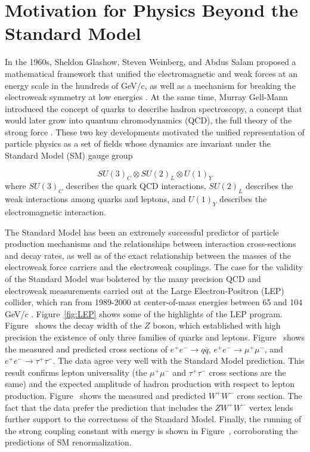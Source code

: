 \documentclass[dissertation.tex]{subfiles}
\begin{document}
\chapter{Motivation for Physics Beyond the Standard Model}
\label{chap:Motivation for Physics Beyond the Standard Model}

\thispagestyle{myheadings}
\markright{\hfill}

In the 1960s, Sheldon Glashow, Steven Weinberg, and Abdus Salam proposed a mathematical framework that unified the electromagnetic and weak forces at an energy scale in the hundreds of GeV/c, as well as a mechanism for breaking the electroweak symmetry at low energies \cite{Glashow1961579,PhysRevD.2.1285,PhysRev.127.965,PhysRevLett.19.1264,Salam1964168}.  At the same time, Murray Gell-Mann introduced the concept of quarks to describe hadron spectroscopy, a concept that would later grow into quantum chromodynamics (QCD), the full theory of the strong force \cite{GellMann1964214,Lichtenberg:784713}.  These two key developments motivated the unified representation of particle physics as a set of fields whose dynamics are invariant under the Standard Model (SM) gauge group

\begin{equation}
SU(3)_{C} \otimes SU(2)_{L} \otimes U(1)_{Y}
\end{equation}
%
where $SU(3)_{C}$ describes the quark QCD interactions, $SU(2)_{L}$ describes the weak interactions among quarks and leptons, and $U(1)_{Y}$ describes the electromagnetic interaction.

The Standard Model has been an extremely successful predictor of particle production mechanisms and the relationships between interaction cross-sections and decay rates, as well as of the exact relationship between the masses of the electroweak force carriers and the electroweak couplings.  The case for the validity of the Standard Model was bolstered by the many precision QCD and electroweak measurements carried out at the Large Electron-Positron (LEP) collider, which ran from 1989-2000 at center-of-mass energies between 65 and 104 GeV/$c$ \cite{Drees}.  Figure~\ref{fig:LEP} shows some of the highlights of the LEP program.  Figure~ shows the decay width of the $Z$ boson, which established with high precision the existence of only three families of quarks and leptons.  Figure~ shows the measured and predicted cross sections of $e^{+}e^{-}\rightarrow q\bar{q}$, $e^{+}e^{-}\rightarrow\mu^{+}\mu^{-}$, and $e^{+}e^{-}\rightarrow\tau^{+}\tau^{-}$.  The data agree very well with the Standard Model prediction.  This result confirms lepton universality (the $\mu^{+}\mu^{-}$ and $\tau^{+}\tau^{-}$ cross sections are the same) and the expected amplitude of hadron production with respect to lepton production.  Figure~ shows the measured and predicted $W^{+}W^{-}$ cross section.  The fact that the data prefer the prediction that includes the $ZW^{+}W^{-}$ vertex lends further support to the correctness of the Standard Model.  Finally, the running of the strong coupling constant with energy is shown in Figure~, corroborating the predictions of SM renormalization.
\end{document}
